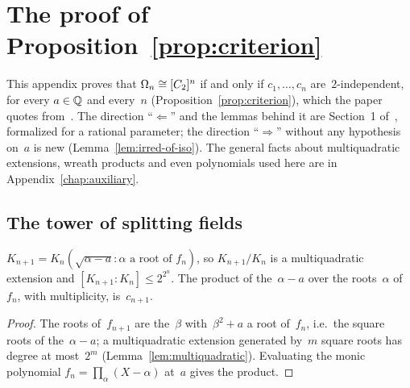 \chapter{\texorpdfstring{The proof of Proposition~\ref{prop:criterion}}{The proof of Proposition 1.7}}
\label{chap:criterion}

This appendix proves that $\Omega_n \cong [C_2]^{n}$ if and only if $c_1, \dots, c_n$
are~$2$-independent, for every $a \in \mathbb{Q}$ and every~$n$ (Proposition~\ref{prop:criterion}), which
the paper quotes from~\cite{paper}. The direction ``$\Leftarrow$'' and the lemmas behind it are
Section~1 of~\cite{paper}, formalized for a rational parameter; the direction ``$\Rightarrow$''
without any hypothesis on~$a$ is new (Lemma~\ref{lem:irred-of-iso}). The general facts about
multiquadratic extensions, wreath products and even polynomials used here are in
Appendix~\ref{chap:auxiliary}.

\section{The tower of splitting fields}

\begin{facts}
  \label{facts:kummer}
  \leanok
  $K_{n+1} = K_n(\sqrt{\alpha - a} : \alpha \text{ a root of } f_n)$, so $K_{n+1}/K_n$ is a
  multiquadratic extension and $[K_{n+1} : K_n] \le 2^{2^n}$. The product of the~$\alpha - a$ over
  the roots~$\alpha$ of~$f_n$, with multiplicity, is~$c_{n+1}$.
\end{facts}
\begin{proof}
  \leanok
  The roots of~$f_{n+1}$ are the~$\beta$ with~$\beta^2 + a$ a root of~$f_n$, i.e.\ the square
  roots of the~$\alpha - a$; a multiquadratic extension generated by~$m$ square roots has degree
  at most~$2^m$ (Lemma~\ref{lem:multiquadratic}). Evaluating the monic polynomial
  $f_n = \prod_\alpha (X - \alpha)$ at~$a$ gives the product.
\end{proof}

